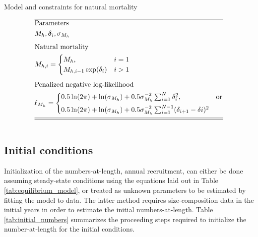 \documentclass[12pt,letterpaper]{article}
\newcounter{saveEq}
\def\putEq{\setcounter{saveEq}{\value{equation}}}
\def\getEq{\setcounter{equation}{\value{saveEq}}}
\def\tableEq{ %
    \putEq \setcounter{equation}{0}
    \renewcommand{\theequation}{T\arabic{table}.\arabic{equation}}
    \vspace{-5mm}
    }
\def\normalEq{ %
    \getEq
    \renewcommand{\theequation}{\arabic{section}.\arabic{equation}}}
\begin{document}
    \begin{table}
      \centering
      \caption{Model and constraints for natural mortality}
      \label{tab:natural_mortality}
      \tableEq
      \begin{align}
      \hline \nonumber
      &\mbox{Parameters} \nonumber \\
      & M_h, \bm{\delta}_i, \sigma_{M_h} \label{T5.1} \\[1ex]
      &\mbox{Natural mortality} \nonumber \\
      & M_{h,i} =
      \begin{cases}
        M_h, &i=1\\
        M_{h,i-1} \exp(\delta_i) &i>1
      \end{cases} \label{T5.2} \\[1ex]
      &\mbox{Penalized negative log-likelihood} \nonumber \\
      &\ell_{M_h} = 
      \begin{cases}
      0.5 \ln(2 \pi) + \ln(\sigma_{M_h}) 
      + 0.5 \sigma_{M_h}^{-2} \sum_{i=1}^{N} \delta_{i}^2, & \mbox{or}  \\[1ex]
      0.5 \ln(2 \pi) + \ln(\sigma_{M_h}) 
      + 0.5 \sigma_{M_h}^{-2}\sum_{i=1}^{N-1}(\delta_{i+1} - \delta{i})^{2}  \\
      \end{cases}\label{T5.3}\\[1ex]
      \hline \hline \nonumber
      \end{align}
      \normalEq
    \end{table}


    \subsection*{Initial conditions} %
    \label{sub:initial_conditions}
      Initialization of the numbers-at-length, annual recruitment, can either be done assuming steady-state conditions using the equations laid out in Table \ref{tab:equilibrium_model}, or treated as unknown parameters to be estimated by fitting the model to data.  The latter method requires size-composition data in the initial years in order to estimate the initial numbers-at-length.  Table \ref{tab:initial_numbers} summarizes the proceeding steps required to initialize the number-at-length for the initial conditions.
\end{document}
